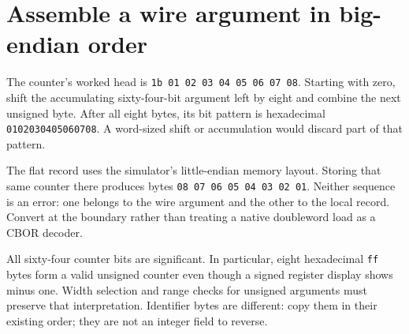 \section{Assemble a wire argument in big-endian order}
The counter's worked head is
\texttt{1b 01 02 03 04 05 06 07 08}. Starting with zero, shift the accumulating
sixty-four-bit argument left by eight and combine the next unsigned byte. After all
eight bytes, its bit pattern is hexadecimal \texttt{0102030405060708}. A word-sized
shift or accumulation would discard part of that pattern.

The flat record uses the simulator's little-endian memory layout. Storing that same
counter there produces bytes \texttt{08 07 06 05 04 03 02 01}. Neither sequence is an
error: one belongs to the wire argument and the other to the local record. Convert at
the boundary rather than treating a native doubleword load as a CBOR decoder.

All sixty-four counter bits are significant. In particular, eight hexadecimal
\texttt{ff} bytes form a valid unsigned counter even though a signed register display
shows minus one. Width selection and range checks for unsigned arguments must preserve
that interpretation. Identifier bytes are different: copy them in their existing order;
they are not an integer field to reverse.
